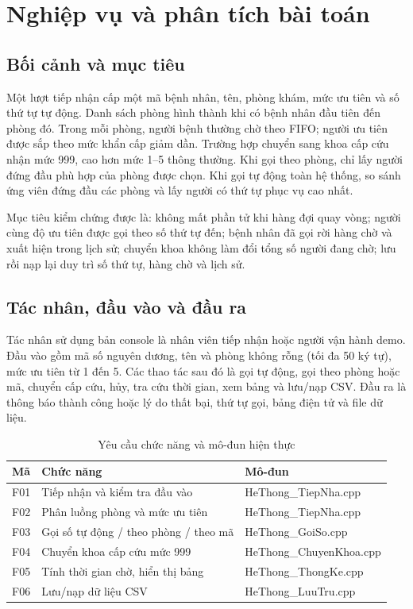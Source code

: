 \documentclass[12pt,a4paper,oneside]{report}
\begin{document}
\tableofcontents
\listoftables
\clearpage

\chapter{Nghiệp vụ và phân tích bài toán}
\section{Bối cảnh và mục tiêu}
Một lượt tiếp nhận cấp một mã bệnh nhân, tên, phòng khám, mức ưu tiên và số thứ tự tự động. Danh sách phòng hình thành khi có bệnh nhân đầu tiên đến phòng đó. Trong mỗi phòng, người bệnh thường chờ theo FIFO; người ưu tiên được sắp theo mức khẩn cấp giảm dần. Trường hợp chuyển sang khoa cấp cứu nhận mức 999, cao hơn mức 1--5 thông thường. Khi gọi theo phòng, chỉ lấy người đứng đầu phù hợp của phòng được chọn. Khi gọi tự động toàn hệ thống, so sánh ứng viên đứng đầu các phòng và lấy người có thứ tự phục vụ cao nhất.

Mục tiêu kiểm chứng được là: không mất phần tử khi hàng đợi quay vòng; người cùng độ ưu tiên được gọi theo số thứ tự đến; bệnh nhân đã gọi rời hàng chờ và xuất hiện trong lịch sử; chuyển khoa không làm đổi tổng số người đang chờ; lưu rồi nạp lại duy trì số thứ tự, hàng chờ và lịch sử.

\section{Tác nhân, đầu vào và đầu ra}
Tác nhân sử dụng bản console là nhân viên tiếp nhận hoặc người vận hành demo. Đầu vào gồm mã số nguyên dương, tên và phòng không rỗng (tối đa 50 ký tự), mức ưu tiên từ 1 đến 5. Các thao tác sau đó là gọi tự động, gọi theo phòng hoặc mã, chuyển cấp cứu, hủy, tra cứu thời gian, xem bảng và lưu/nạp CSV. Đầu ra là thông báo thành công hoặc lý do thất bại, thứ tự gọi, bảng điện tử và file dữ liệu.

\begin{table}[H]\centering
\caption{Yêu cầu chức năng và mô-đun hiện thực}
\begin{tabular}{p{1.5cm}p{6.8cm}p{5cm}}\toprule
Mã & Chức năng & Mô-đun\\\midrule
F01 & Tiếp nhận và kiểm tra đầu vào & HeThong\_TiepNha.cpp\\
F02 & Phân luồng phòng và mức ưu tiên & HeThong\_TiepNha.cpp\\
F03 & Gọi số tự động / theo phòng / theo mã & HeThong\_GoiSo.cpp\\
F04 & Chuyển khoa cấp cứu mức 999 & HeThong\_ChuyenKhoa.cpp\\
F05 & Tính thời gian chờ, hiển thị bảng & HeThong\_ThongKe.cpp\\
F06 & Lưu/nạp dữ liệu CSV & HeThong\_LuuTru.cpp\\\bottomrule
\end{tabular}
\end{table}
\end{document}
